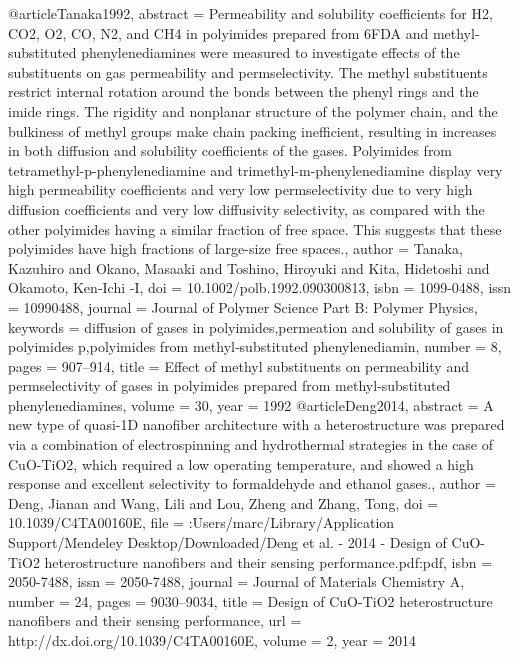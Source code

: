 @article{Tanaka1992,
abstract = {Permeability and solubility coefficients for H2, CO2, O2, CO, N2, and CH4 in polyimides prepared from 6FDA and methyl-substituted phenylenediamines were measured to investigate effects of the substituents on gas permeability and permselectivity. The methyl substituents restrict internal rotation around the bonds between the phenyl rings and the imide rings. The rigidity and nonplanar structure of the polymer chain, and the bulkiness of methyl groups make chain packing inefficient, resulting in increases in both diffusion and solubility coefficients of the gases. Polyimides from tetramethyl-p-phenylenediamine and trimethyl-m-phenylenediamine display very high permeability coefficients and very low permselectivity due to very high diffusion coefficients and very low diffusivity selectivity, as compared with the other polyimides having a similar fraction of free space. This suggests that these polyimides have high fractions of large-size free spaces.},
author = {Tanaka, Kazuhiro and Okano, Masaaki and Toshino, Hiroyuki and Kita, Hidetoshi and Okamoto, Ken‐Ichi ‐I},
doi = {10.1002/polb.1992.090300813},
isbn = {1099-0488},
issn = {10990488},
journal = {Journal of Polymer Science Part B: Polymer Physics},
keywords = {diffusion of gases in polyimides,permeation and solubility of gases in polyimides p,polyimides from methyl‐substituted phenylenediamin},
number = {8},
pages = {907--914},
title = {{Effect of methyl substituents on permeability and permselectivity of gases in polyimides prepared from methyl‐substituted phenylenediamines}},
volume = {30},
year = {1992}
}
@article{Deng2014,
abstract = {A new type of quasi-1D nanofiber architecture with a heterostructure was prepared via a combination of electrospinning and hydrothermal strategies in the case of CuO-TiO2, which required a low operating temperature, and showed a high response and excellent selectivity to formaldehyde and ethanol gases.},
author = {Deng, Jianan and Wang, Lili and Lou, Zheng and Zhang, Tong},
doi = {10.1039/C4TA00160E},
file = {:Users/marc/Library/Application Support/Mendeley Desktop/Downloaded/Deng et al. - 2014 - Design of CuO-TiO2 heterostructure nanofibers and their sensing performance.pdf:pdf},
isbn = {2050-7488},
issn = {2050-7488},
journal = {Journal of Materials Chemistry A},
number = {24},
pages = {9030--9034},
title = {{Design of CuO-TiO2 heterostructure nanofibers and their sensing performance}},
url = {http://dx.doi.org/10.1039/C4TA00160E},
volume = {2},
year = {2014}
}

